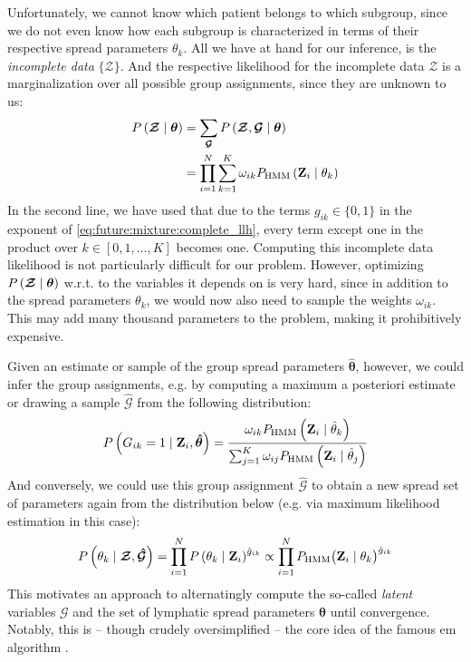 \documentclass[\relativeRoot/main.tex]{subfiles}
\begin{document}
Unfortunately, we cannot know which patient belongs to which subgroup, since we do not even know how each subgroup is characterized in terms of their respective spread parameters $\theta_k$. All we have at hand for our inference, is the \emph{incomplete data} $\{ \boldsymbol{\mathcal{Z}} \}$. And the respective likelihood for the incomplete data $\boldsymbol{\mathcal{Z}}$ is a marginalization over all possible group assignments, since they are unknown to us:
%
\begin{equation}
    \begin{aligned}
        P \left( \boldsymbol{\mathcal{Z}} \mid \boldsymbol{\theta} \right) &= \sum_{\boldsymbol{\mathcal{G}}}{ P \left( \boldsymbol{\mathcal{Z}}, \boldsymbol{\mathcal{G}} \mid \boldsymbol{\theta} \right) } \\
        &= \prod_{i=1}^N{ \sum_{k=1}^K{ \omega_{ik} P_\text{HMM} \left( \mathbf{Z}_i \mid \theta_k \right) } }
    \end{aligned}
\end{equation}
%
In the second line, we have used that due to the terms $g_{ik} \in \{ 0,1 \}$ in the exponent of \cref{eq:future:mixture:complete_llh}, every term except one in the product over $k \in [0,1, \ldots, K]$ becomes one. Computing this incomplete data likelihood is not particularly difficult for our problem. However, optimizing $P \left( \boldsymbol{\mathcal{Z}} \mid \boldsymbol{\theta} \right)$ w.r.t. to the variables it depends on is very hard, since in addition to the spread parameters $\theta_k$, we would now also need to sample the weights $\omega_{ik}$. This may add many thousand parameters to the problem, making it prohibitively expensive.

Given an estimate or sample of the group spread parameters $\boldsymbol{\hat{\theta}}$, however, we could infer the group assignments, e.g. by computing a maximum a posteriori estimate or drawing a sample $\boldsymbol{\hat{\mathcal{G}}}$ from the following distribution:
%
\begin{equation}
    P \left( G_{ik} = 1 \mid \mathbf{Z}_i, \boldsymbol{\hat{\theta}} \right) = \frac{\omega_{ik} P_\text{HMM} \left( \mathbf{Z}_i \mid \hat{\theta}_k \right)}{\sum_{j=1}^K{ \omega_{ij} P_\text{HMM} \left( \mathbf{Z}_i \mid \hat{\theta}_j \right) } }
\end{equation}
%
And conversely, we could use this group assignment $\boldsymbol{\hat{\mathcal{G}}}$ to obtain a new spread set of parameters again from the distribution below (e.g. via maximum likelihood estimation in this case):
%
\begin{equation}
    P \left( \theta_k \mid \boldsymbol{\mathcal{Z}}, \boldsymbol{\hat{\mathcal{G}}} \right) = \prod_{i=1}^N P \left( \theta_k \mid \mathbf{Z}_i \right)^{\hat{g}_{ik}} \propto \prod_{i=1}^N{ P_\text{HMM} \big( \mathbf{Z}_i \mid \theta_k \big)^{\hat{g}_{ik}} }
\end{equation}
%
This motivates an approach to alternatingly compute the so-called \emph{latent} variables $\boldsymbol{\mathcal{G}}$ and the set of lymphatic spread parameters $\boldsymbol{\theta}$ until convergence. Notably, this is -- though crudely oversimplified -- the core idea of the famous \gls{em} algorithm \cite{dempster_maximum_1977}.
\end{document}
